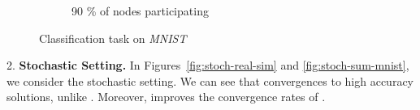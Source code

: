 \documentclass[10pt]{article}
\begin{document}
\begin{figure}[H]
\begin{subfigure}{.33\textwidth}
        \caption{90 \% of nodes participating}
    \end{subfigure}
    \caption{Classification task on \textit{MNIST}}
\label{fig:finite-sum-mnist}
\end{figure}


\vspace{-0.3cm}
{2. \bf Stochastic Setting.} In Figures~\ref{fig:stoch-real-sim} and \ref{fig:stoch-sum-mnist}, we consider the stochastic setting. We can see that  convergences to high accuracy solutions, unlike . Moreover,  improves the convergence rates of .
\end{document}
